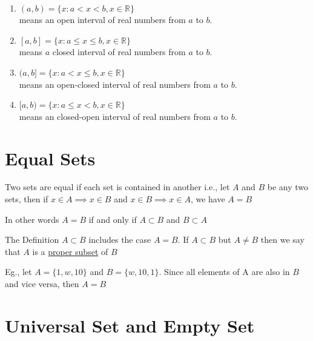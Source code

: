 \begin{examples}
    \mbox{}\\[-\baselineskip] %
    \begin{enumerate}
        \item $(a,b) = \{x:  a<x<b, x \in \mathbb{R}\} $\\
              means an open interval of real numbers from $a$ to $b$.
        \item $[a,b] = \{x: a \leq x \leq b, x \in \mathbb{R}\} $\\
              means $a$ closed interval of real numbers from $a$ to $b$.
        \item $(a,b] = \{x: a < x \leq b, x \in \mathbb{R}\} $\\
              means an open-closed interval of real numbers from $a$ to $b$.
        \item $[a,b) = \{x: a \leq x < b, x \in \mathbb{R}\} $\\
              means an closed-open interval of real numbers from $a$ to $b$.
    \end{enumerate}
\end{examples}
\section{Equal Sets}
\begin{definition}
    Two sets are equal if each set is contained in another i.e., let $A$ and $B$ be any two sets, then if $x \in A \implies x \in B$ and $x \in B \implies x \in A$, we have $A = B$
\end{definition}

\begin{para}
    In other words $A=B$ if and only if $A \subset B$ and $B \subset A$
\end{para}
\begin{para}
    The Definition $A \subset B$ includes the case $A=B$. If $A \subset B$ but $A \ne B$ then we say that $A$ is a \underline{proper subset} of $B$
\end{para}

\begin{para}
    Eg., let $A = \{1,w,10\}$ and $B = \{w,10,1\}$. Since all elements of A are also in $B$ and vice versa, then $A = B$
\end{para}
\section{Universal Set and Empty Set}


